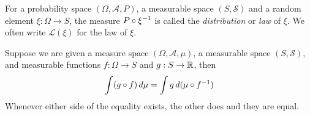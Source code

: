 \begin{defn}For a probability space $(\Omega, \mathcal{A}, P)$, a
  measurable space $(S, \mathcal{S})$ and a
  random element $\xi : \Omega \to S$, the measure $P \circ \xi^{-1}$ is
  called the \emph{distribution} or \emph{law} of $\xi$.  We often
  write $\mathcal{L}(\xi)$ for the law of $\xi$.
\end{defn}
\begin{lem}\label{ChangeOfVariables}Suppose we are given a measure space $(\Omega, \mathcal{A},
  \mu)$, a measurable space $(S, \mathcal{S})$, and measurable
  functions $f : \Omega \to S$ and $g : S \to \mathbb{R}$, then 
\begin{align*}
\int (g \circ f) \, d \mu = \int g \, d (\mu \circ f^{-1})
\end{align*}
Whenever either side of the equality exists, the other does and they
are equal.
\end{lem}
